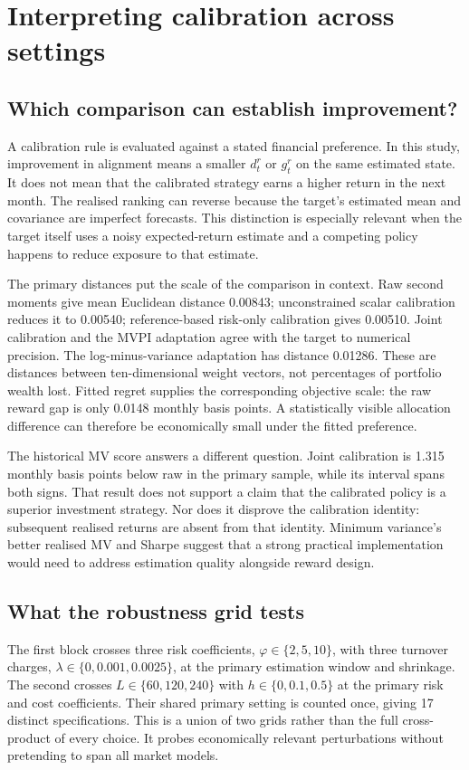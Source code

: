 \documentclass[sigconf,review]{acmart}
\begin{document}
\section{Interpreting calibration across settings}
\subsection{Which comparison can establish improvement?}
A calibration rule is evaluated against a stated financial preference. In this study, improvement in alignment means a smaller $d_t^r$ or $g_t^r$ on the same estimated state. It does not mean that the calibrated strategy earns a higher return in the next month. The realised ranking can reverse because the target's estimated mean and covariance are imperfect forecasts. This distinction is especially relevant when the target itself uses a noisy expected-return estimate and a competing policy happens to reduce exposure to that estimate.

The primary distances put the scale of the comparison in context. Raw second moments give mean Euclidean distance 0.00843; unconstrained scalar calibration reduces it to 0.00540; reference-based risk-only calibration gives 0.00510. Joint calibration and the MVPI adaptation agree with the target to numerical precision. The log-minus-variance adaptation has distance 0.01286. These are distances between ten-dimensional weight vectors, not percentages of portfolio wealth lost. Fitted regret supplies the corresponding objective scale: the raw reward gap is only 0.0148 monthly basis points. A statistically visible allocation difference can therefore be economically small under the fitted preference.

The historical MV score answers a different question. Joint calibration is 1.315 monthly basis points below raw in the primary sample, while its interval spans both signs. That result does not support a claim that the calibrated policy is a superior investment strategy. Nor does it disprove the calibration identity: subsequent realised returns are absent from that identity. Minimum variance's better realised MV and Sharpe suggest that a strong practical implementation would need to address estimation quality alongside reward design.

\subsection{What the robustness grid tests}
The first block crosses three risk coefficients, $\varphi\in\{2,5,10\}$, with three turnover charges, $\lambda\in\{0,0.001,0.0025\}$, at the primary estimation window and shrinkage. The second crosses $L\in\{60,120,240\}$ with $h\in\{0,0.1,0.5\}$ at the primary risk and cost coefficients. Their shared primary setting is counted once, giving 17 distinct specifications. This is a union of two grids rather than the full cross-product of every choice. It probes economically relevant perturbations without pretending to span all market models.
\end{document}
